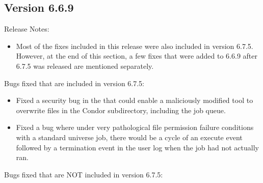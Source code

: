 \subsection{\label{sec:New-6-6-9}Version 6.6.9}

\noindent Release Notes:

\begin{itemize}

\item Most of the fixes included in this release were also included in
  version 6.7.5.
  However, at the end of this section, a few fixes that were added to
  6.6.9 after 6.7.5 was released are mentioned separately.

\end{itemize}

%
%
%

\noindent Bugs fixed that are included in version 6.7.5:

\begin{itemize}

\item Fixed a security bug in the  that could enable a
maliciously modified  tool to overwrite files in the Condor
 subdirectory, including the job queue.

\item Fixed a bug where under very pathological file permission failure
conditions with a standard universe job, there would be a cycle of an
execute event followed by a termination event in the user log when the
job had not actually ran.


\end{itemize}

\noindent Bugs fixed that are NOT included in version 6.7.5:

